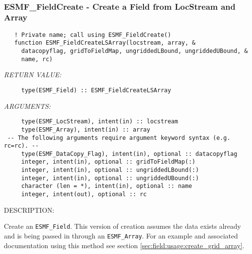 \mbox{}\hrulefill\ 
 
\subsubsection [ESMF\_FieldCreate] {ESMF\_FieldCreate - Create a Field from LocStream and Array}


\begin{verbatim}   ! Private name; call using ESMF_FieldCreate()
   function ESMF_FieldCreateLSArray(locstream, array, &
     datacopyflag, gridToFieldMap, ungriddedLBound, ungriddedUBound, &
     name, rc)\end{verbatim}{\em RETURN VALUE:}
\begin{verbatim}     type(ESMF_Field) :: ESMF_FieldCreateLSArray\end{verbatim}{\em ARGUMENTS:}
\begin{verbatim}     type(ESMF_LocStream), intent(in) :: locstream
     type(ESMF_Array), intent(in) :: array
 -- The following arguments require argument keyword syntax (e.g. rc=rc). --
     type(ESMF_DataCopy_Flag), intent(in), optional :: datacopyflag
     integer, intent(in), optional :: gridToFieldMap(:)
     integer, intent(in), optional :: ungriddedLBound(:)
     integer, intent(in), optional :: ungriddedUBound(:)
     character (len = *), intent(in), optional :: name
     integer, intent(out), optional :: rc\end{verbatim}
{\sf DESCRIPTION:\\ }


   Create an {\tt ESMF\_Field}. This version of creation
   assumes the data exists already and is being
   passed in through an {\tt ESMF\_Array}. For an example and
   associated documentation using this method see section
   \ref{sec:field:usage:create_grid_array}.
  

